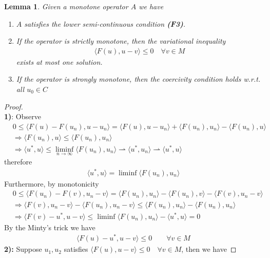 \documentclass[a4paper,11pt,oneside,fleqn]{book}
\newtheorem{lemma}[theorem]{Lemma}
\theoremstyle{definition}
\theoremstyle{remark}
\begin{document}
\begin{lemma}
	Given a monotone operator $A$ we have
	\begin{enumerate}
		\item $A$ satisfies the lower semi-continuous condition \textbf{(F3)}.  
		\item If the operator is strictly monotone, then the variational inequality
				\begin{align*}
			\langle F(u), u - v \rangle \le 0 \quad \forall v \in M
		\end{align*}
		exists at most one solution. 
		\item If the operator is strongly monotone, then the coercivity condition holds w.r.t. all $u_0 \in C$
	\end{enumerate}
\end{lemma}
\begin{proof}
\quad\\
\textbf{1)}: Observe
\begin{align*}
	&0 \le \langle F(u) - F(u_n), u - u_n \rangle = \langle F(u), u - u_n \rangle + \langle F(u_n), u_n \rangle - \langle F(u_n), u \rangle \\
	&\Rightarrow \langle F(u_n) , u \rangle \le \langle F(u_n), u_n \rangle \\
	&\Rightarrow \langle u^*, u \rangle \le \liminf_{n \rightarrow \infty} \langle F(u_n), u_n \rangle \rightharpoonup \langle u^*, u_n \rangle \rightharpoonup \langle u^*, u \rangle 
\end{align*}
therefore
\begin{align*}
	\langle u^*, u \rangle = \liminf \langle F(u_n), u_n \rangle 
\end{align*}
Furthermore, by monotonicity
\begin{align*}
	&0 \le \langle F(u_n) - F(v), u_n - v \rangle = \langle F(u_n), u_n \rangle - \langle F(u_n), v \rangle  - \langle F(v), u_n - v \rangle\\
	&\Rightarrow
	\langle F(v), u_n - v \rangle - \langle F(u_n), u_n - v\rangle \le \langle F(u_n), u_n \rangle - \langle F(u_n), u_n \rangle\\
	&\Rightarrow 
	\langle F(v) - u^*,  u - v \rangle \le \liminf \langle F(u_n), u_n \rangle - \langle u^*, u \rangle  = 0
\end{align*}
By the Minty's trick we have
\begin{align*}
	\langle F(u) - u^*, u - v \rangle \le 0 \qquad \forall v \in M
\end{align*}
\textbf{2):} Suppose $u_1, u_2$ satisfies $\langle F(u), u - v \rangle \le 0 \quad \forall v \in M$, then  we have

\end{proof}
\end{document}
